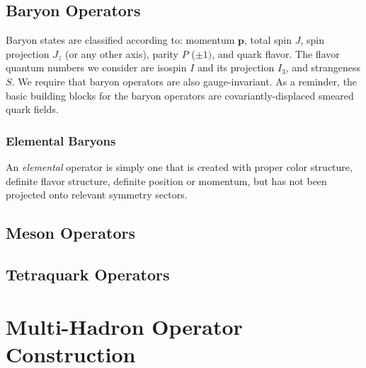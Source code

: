     \subsection{Baryon Operators}
    Baryon states are classified according to: momentum $\boldsymbol p$, total spin $J$, spin projection $J_z$ (or any other axis), parity $P$ ($\pm 1)$, and quark flavor. The flavor quantum numbers we consider are isospin $I$ and its projection $I_3$, and strangeness $S$. We require that baryon operators are also gauge-invariant. As a reminder, the basic building blocks for the baryon operators are covariantly-displaced smeared quark fields.
    \subsubsection{Elemental Baryons}
    An \emph{elemental} operator is simply one that is created with proper color structure, definite flavor structure, definite position or momentum, but has not been projected onto relevant symmetry sectors.
    \subsection{Meson Operators}
    \subsection{Tetraquark Operators}
    \section{Multi-Hadron Operator Construction}